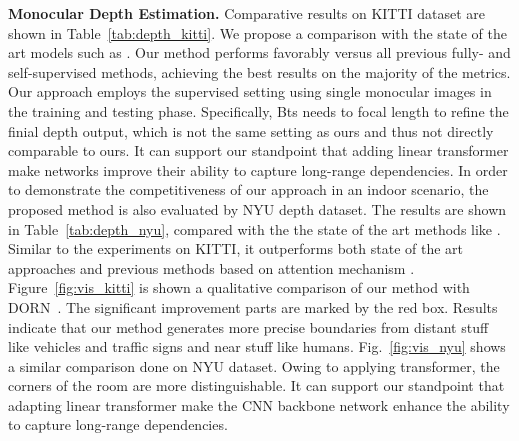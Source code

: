\noindent \textbf{Monocular Depth Estimation.} 
Comparative results on KITTI dataset are shown in Table~\ref{tab:depth_kitti}. We propose a comparison with the state of the art models such as \cite{ranjan2019competitive,bian2019unsupervised,spencer2020defeat,cheng2020s,godard2019digging,tiwari2020pseudo,johnston2020self,klingner2020self,shu2020feature,guizilini20203d,fu2018deep,yin2019enforcing,gonzalez2020forget,lee2019big}. 
Our method performs favorably versus all previous fully- and self-supervised methods, achieving the best results on the majority of the metrics. 
Our approach employs the supervised setting using single monocular images in the training and testing phase.
Specifically, Bts needs to focal length to refine the finial depth output, which is not the same setting as ours and thus not directly comparable to ours. It can support our standpoint that adding linear transformer make networks improve their ability to capture long-range dependencies.
In order to demonstrate the competitiveness of our approach in an indoor scenario, the proposed method is also evaluated by NYU depth dataset. The results are shown in Table~\ref{tab:depth_nyu}, compared with the the state of the art methods like \cite{xu2018pad,li2017two,wang2020cliffnet,laina2016deeper,xu2017multi,lee2020multi,xia2020generating,fu2018deep,lee2019big,yin2019enforcing,huynh2020guiding}.
Similar to the experiments on KITTI, it outperforms both state of the art approaches and previous methods based on attention mechanism \cite{xu2017multi,xu2018pad,huynh2020guiding}. Figure~\ref{fig:vis_kitti} is shown a qualitative comparison of our method with DORN~\cite{fu2018deep}. The significant improvement parts are marked by the red box. 
Results indicate that our method generates more precise boundaries from distant stuff like vehicles and traffic signs and near stuff like humans.
Fig.~\ref{fig:vis_nyu} shows a similar comparison done on NYU dataset. Owing to applying transformer, the corners of the room are more distinguishable. It can support our standpoint that adapting linear transformer make the CNN backbone network enhance the ability to capture long-range dependencies. 

